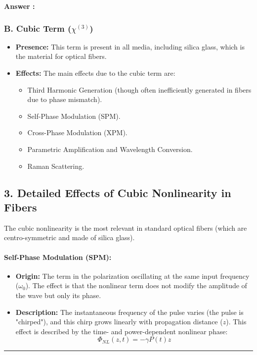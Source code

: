 \documentclass[a4paper,11pt]{book}
\newcounter{qacount}
\newenvironment{answer}{
  \noindent\textbf{Answer \theqacount:}\space
}{
  \par\vspace{1em}   %
  \hrule             %
  \vspace{0.5em}     %
}
\begin{document}
\begin{answer}
    \subsubsection*{B. Cubic Term ($\chi^{(3)}$)}
    \begin{itemize}
        \item \textbf{Presence:} This term is present in all media, including silica glass, which is the material for optical fibers.
        \item \textbf{Effects:} The main effects due to the cubic term are:
              \begin{itemize}
                  \item Third Harmonic Generation (though often inefficiently generated in fibers due to phase mismatch).
                  \item Self-Phase Modulation (SPM).
                  \item Cross-Phase Modulation (XPM).
                  \item Parametric Amplification and Wavelength Conversion.
                  \item Raman Scattering.
              \end{itemize}
    \end{itemize}

    \subsection*{3. Detailed Effects of Cubic Nonlinearity in Fibers}

    The cubic nonlinearity is the most relevant in standard optical fibers (which are centro-symmetric and made of silica glass).

    \paragraph{Self-Phase Modulation (SPM):}
    \begin{itemize}
        \item \textbf{Origin:} The term in the polarization oscillating at the same input frequency ($\omega_0$). The effect is that the nonlinear term does not modify the amplitude of the wave but only its phase.
        \item \textbf{Description:} The instantaneous frequency of the pulse varies (the pulse is "chirped"), and this chirp grows linearly with propagation distance ($z$). This effect is described by the time- and power-dependent nonlinear phase:
              \begin{equation}
                  \Phi_{NL}(z,t)=-\gamma P(t)z
              \end{equation}
    \end{itemize}


\end{answer}
\end{document}
